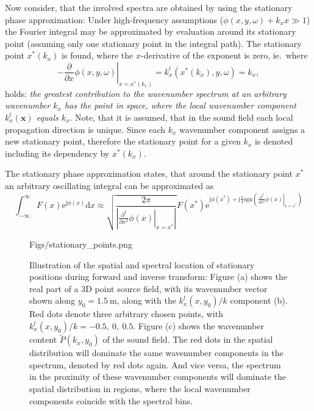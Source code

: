 \documentclass[12pt,a4paper]{article}
\newcommand{\td}{\mathrm{d}}
\newcommand{\te}{\mathrm{e}}
\newcommand{\ti}{\mathrm{j}}
\newcommand{\vx}{\mathbf{x}}
\begin{document}
Now consider, that the involved spectra are obtained by using the stationary phase approximation:
Under high-frequency assumptions ($\phi(x,y,\omega)+k_x x \gg 1$) the Fourier integral may be approximated by evaluation around its stationary point (assuming only one stationary point in the integral path).
The stationary point $x^*(k_x)$ is found, where the $x$-derivative of the exponent is zero, ie.\ where
\begin{equation}
- \left. \frac{\partial}{\partial x} \phi(x,y,\omega) \right|_{x = x^*(k_x)} = k_x^l(x^*(k_x),y,\omega) = k_x,
\end{equation}
holds: \emph{the greatest contribution to the wavenumber spectrum at an arbitrary wavenumber $k_x$ has the point in space, where the local wavenumber component $k_x^l(\vx)$ equals $k_x$}.
Note, that it is assumed, that in the sound field each local propagation direction is unique.
Since each $k_x$ wavenumber component assigns a new stationary point, therefore the stationary point for a given $k_x$ is denoted including its dependency by $x^*(k_x)$.

The stationary phase approximation states, that around the stationary point $x^*$ an arbitrary oscillating integral can be approximated as 
\begin{equation}
\int_{-\infty}^{\infty} F(x)\te^{\ti \phi(x)} \td x \approx \sqrt{\frac{2\pi}{| \left. \frac{\partial^2}{\partial x^2} \phi(x)\right|_{x = x^*}|  }}
F(x^*) \te^{\ti \phi(x^*) + 
\ti \frac{\pi}{4} \text{sgn}\left( \left. \frac{\partial^2}{\partial x^2} \phi(x)\right|_{x = x^*} \right)}
\end{equation}

\begin{figure}
	\centering
	\begin{overpic}[width = 1\columnwidth]{Figs/stationary_points.png}
	\scriptsize
	\end{overpic}
	\caption{Illustration of the spatial and spectral location of stationary positions during forward and inverse transform: Figure (a) shows the real part of a 3D point source field, with its wavenumber vector shown along $y_0 = 1.5~\mathrm{m}$, along with the $k^l_x(x,y_0)/k$ component (b).
Red dots denote three arbitrary chosen points, with $k^l_x(x,y_0)/k = -0.5,\ 0,\ 0.5$.
Figure (c) shows the wavenumber content $\tilde{P}(k_x,y_0)$ of the sound field.
The red dots in the spatial distribution will dominate the same wavenumber components in the spectrum, denoted by red dots again.
And vice versa, the spectrum in the proximity of these wavenumber components will dominate the spatial distribution in regions, where the local wavenumber components coincide with the spectral bins.}
	\label{fig:stationary_positions}
\end{figure}
\end{document}
